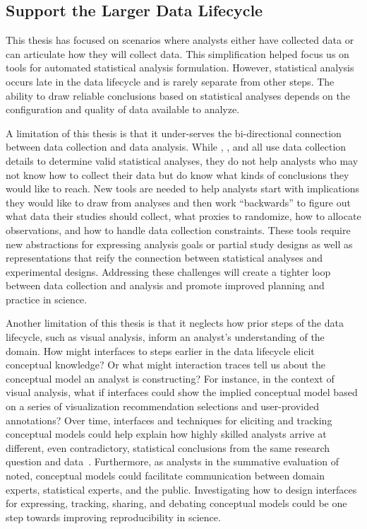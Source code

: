 \subsection{Support the Larger Data Lifecycle}

This thesis has focused on scenarios where analysts either have collected data
or can articulate how they will collect data. This simplification helped focus
us on tools for automated statistical analysis formulation. However, statistical
analysis occurs late in the data lifecycle and is rarely separate from other
steps. The ability to draw reliable conclusions based on statistical analyses
depends on the configuration and quality of data available to analyze. 


A limitation of this thesis is that it under-serves the bi-directional
connection between data collection and data analysis. While \tea, \tisane, and
\rTisane all use data collection details to determine valid statistical
analyses, they do not help analysts who may not know how to collect their data
but do know what kinds of conclusions they would like to reach. New tools are
needed to help analysts start with implications they would like to
draw from analyses and then work ``backwards'' to figure out what data their studies should
collect, what proxies to randomize, how to allocate observations, and how to
handle data collection constraints. These tools require new abstractions for
expressing analysis goals or partial study designs as well as representations
that reify the connection between statistical analyses and experimental designs.
Addressing these challenges will create a tighter loop between data collection
and analysis and promote improved planning and practice in science.

Another limitation of this thesis is that it neglects how prior steps of the
data lifecycle, such as visual analysis, inform an analyst's understanding of
the domain. How might interfaces to steps earlier in the data lifecycle elicit
conceptual knowledge? Or what might interaction traces tell us about the
conceptual model an analyst is constructing? For instance, in the context of
visual analysis, what if interfaces could show the implied conceptual model
based on a series of visualization recommendation selections and user-provided
annotations? Over time, interfaces and techniques for eliciting and tracking
conceptual models could help explain how highly skilled analysts arrive at
different, even contradictory, statistical conclusions from the same research
question and data~\cite{silberzahn2018manyAnalysts}. Furthermore, as analysts in
the summative evaluation of \rTisane noted, conceptual models could facilitate
communication between domain experts, statistical experts, and the public.
Investigating how to design interfaces for expressing, tracking, sharing, and
debating conceptual models could be one step towards improving reproducibility in science.

